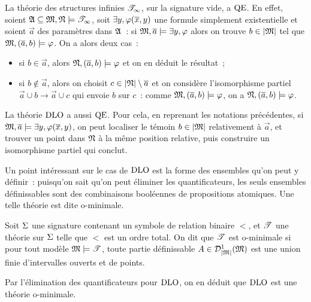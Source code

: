 \begin{example}
  La théorie des structures infinies $\mathscr T_{\infty}$, sur la signature vide, a
  $\operatorname{QE}$. En effet, soient $\mathfrak{A}\subseteq\mathfrak{M},\mathfrak{N}\models\mathscr T_{\infty}$,
  soit $\exists y, \varphi(\overline{x},y)$ une formule simplement existentielle et
  soient $\vec a$ des paramètres dans $\mathfrak{A}$~: si
  $\mathfrak{M},\overline{a}\models\exists y,\varphi$ alors on trouve $b \in \left\vert \mathfrak{M}\right\vert$ tel
  que $\mathfrak{M},(\overline{a},b)\models\varphi$. On a alors deux cas~:
  \begin{itemize}
  \item si $b \in \vec a$, alors $\mathfrak{N},(\overline{a},b)\models\varphi$ et on en
    déduit le résultat~;
  \item si $b\notin\vec a$, alors on choisit $c\in\left\vert \mathfrak{N}\right\vert\setminus\overline{a}$ et on
    considère l'isomorphisme partiel $\vec a \cup b \to \vec a \cup c$
    qui envoie $b$ sur $c$~: comme $\mathfrak{M},(\overline{a},b)\models\varphi$, on a
    $\mathfrak{N},(\overline{a},b)\models\varphi$.
  \end{itemize}
\end{example}

\begin{example}
  La théorie $\operatorname{DLO}$ a aussi $\operatorname{QE}$. Pour cela, en reprenant les notations
  précédentes, si $\mathfrak{M},\overline{a}\models\exists y, \varphi(\overline{x},y)$, on peut
  localiser le témoin $b \in \left\vert \mathfrak{M}\right\vert$ relativement à $\vec a$, et trouver un
  point dans $\mathfrak{N}$ à la même position relative, puis construire un
  isomorphisme partiel qui conclut.
\end{example}

Un point intéressant sur le cas de $\operatorname{DLO}$ est la forme des ensembles qu'on peut
y définir~: puisqu'on sait qu'on peut éliminer les quantificateurs, les seuls
ensembles définissables sont des combinaisons booléennes de propositions
atomiques. Une telle théorie est dite o-minimale.

\begin{definition}
  Soit $\Sigma$ une signature contenant un symbole de relation binaire $<$, et
  $\mathscr T$ une théorie sur $\Sigma$ telle que $<$ est un ordre total. On dit que
  $\mathscr T$ est o-minimale si pour tout modèle $\mathfrak{M}\models\mathscr T$, toute partie
  définissable $A\in\mathcal{D}^1_{\left\vert \mathfrak{M}\right\vert}(\mathfrak{M})$ est une union finie
  d'intervalles ouverts et de points.
\end{definition}

\begin{example}
  Par l'élimination des quantificateurs pour $\operatorname{DLO}$, on en déduit que $\operatorname{DLO}$ est
  une théorie o-minimale.
\end{example}

